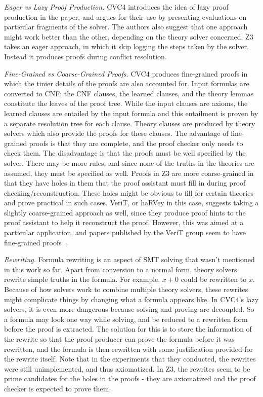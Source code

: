 \documentclass{article}
\begin{document}
\textit{Eager vs Lazy Proof Production.} CVC4 introduces 
the idea of lazy proof production in the paper, and argues 
for their use by presenting evaluations on particular 
fragments of the solver. The authors also suggest that one 
approach might work better than the other, depending on 
the theory solver concerned. Z3 takes an eager approach, 
in which it skip logging the steps taken by the solver.
Instead it produces proofs during conflict resolution.
 
\textit{Fine-Grained vs Coarse-Grained Proofs.} CVC4 
produces fine-grained proofs in which the tinier
details of the proofs are also accounted for. 
Input formulas are converted 
to CNF; the CNF clauses, the learned clauses, and the 
theory lemmas constitute the leaves of the proof tree.
While the input clauses are axioms, the learned clauses 
are entailed by the input formula and this entailment is
proven by a separate resolution tree for each clause. 
Theory clauses are produced by theory solvers which 
also provide the proofs for these clauses. The advantage 
of fine-grained proofs is that they are complete, and 
the proof checker only needs to check them. The disadvantage
is that the proofs must be well specified by the solver.
There may be more rules, and since none of the 
truths in the theories are assumed, they must be specified 
as well. Proofs in Z3 are more coarse-grained in that they
have holes in them that the proof assistant must fill in
during proof checking/reconstruction. These holes might be 
obvious to fill for certain theories and prove practical 
in such cases. VeriT, or haRVey in this case, suggests 
taking a slightly coarse-grained approach as well, since 
they produce proof hints to the proof assistant to 
help it reconstruct the proof. However, this was aimed 
at a particular application, and papers published by 
the VeriT group seem to have fine-grained 
proofs~\cite{DBLP:conf/cade/BarbosaBF17}.

\textit{Rewriting.} Formula rewriting is an aspect 
of SMT solving that wasn't mentioned in this work 
so far. Apart from conversion to a normal form, 
theory solvers rewrite simple truths in the formula.
For example, $x + 0$ could be rewritten to $x$. 
Because of how solvers work to combine multiple 
theory solvers, these rewrites might complicate 
things by changing what a formula appears like. In CVC4's
lazy solvers, it is even more dangerous because 
solving and proving are decoupled. So a formula may 
look one way while solving, and be reduced to a 
rewritten form before the proof is extracted. The 
solution for this is to store the information of the 
rewrite so that the proof producer can prove the 
formula before it was rewritten, and the formula 
is then rewritten with some justification provided 
for the rewrite itself. Note that in the experiments 
that they conducted, the rewrites were still 
unimplemented, and thus axiomatized. In Z3, the 
rewrites seem to be prime candidates for the holes
in the proofs - they are axiomatized and the proof
checker is expected to prove them.
\end{document}
